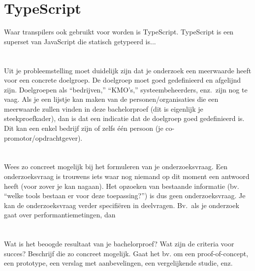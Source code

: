 \section{TypeScript}

Waar transpilers ook gebruikt voor worden is TypeScript. TypeScript is een superset van JavaScript die statisch getypeerd is... 


\section{}
\label{sec:probleemstelling}

Uit je probleemstelling moet duidelijk zijn dat je onderzoek een meerwaarde heeft voor een concrete doelgroep. De doelgroep moet goed gedefinieerd en afgelijnd zijn. Doelgroepen als ``bedrijven,'' ``KMO's,'' systeembeheerders, enz.~zijn nog te vaag. Als je een lijstje kan maken van de personen/organisaties die een meerwaarde zullen vinden in deze bachelorproef (dit is eigenlijk je steekproefkader), dan is dat een indicatie dat de doelgroep goed gedefinieerd is. Dit kan een enkel bedrijf zijn of zelfs één persoon (je co-promotor/opdrachtgever).

\section{}
\label{sec:onderzoeksvraag}

Wees zo concreet mogelijk bij het formuleren van je onderzoeksvraag. Een onderzoeksvraag is trouwens iets waar nog niemand op dit moment een antwoord heeft (voor zover je kan nagaan). Het opzoeken van bestaande informatie (bv. ``welke tools bestaan er voor deze toepassing?'') is dus geen onderzoeksvraag. Je kan de onderzoeksvraag verder specifiëren in deelvragen. Bv.~als je onderzoek gaat over performantiemetingen, dan 

\section{}
\label{sec:onderzoeksdoelstelling}

Wat is het beoogde resultaat van je bachelorproef? Wat zijn de criteria voor succes? Beschrijf die zo concreet mogelijk. Gaat het bv. om een proof-of-concept, een prototype, een verslag met aanbevelingen, een vergelijkende studie, enz.

